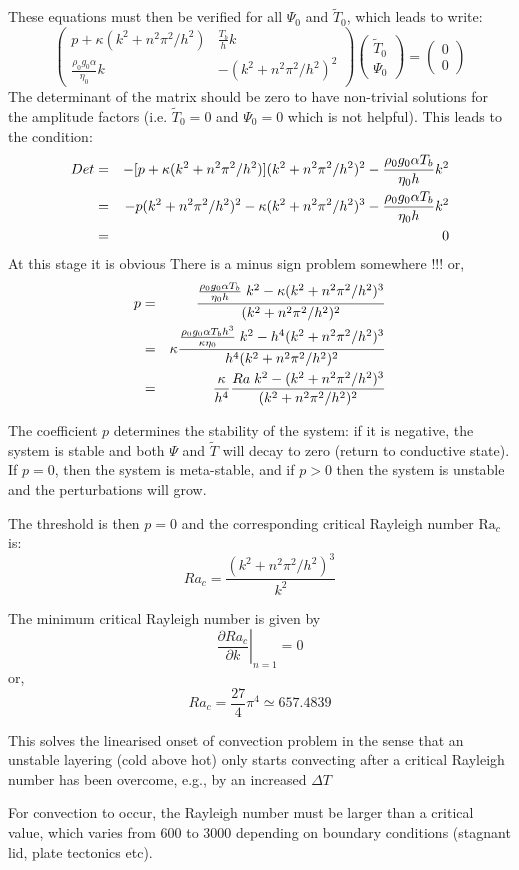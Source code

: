 These equations must then be verified for all $\Psi_0$ and $\tilde{T}_0$, 
which leads to write:
\[
\left(
\begin{array}{cc}
p + \kappa (k^2+n^2\pi^2/h^2) & \frac{T_b}{h} k \\
\frac{\rho_0 g_0 \alpha}{\eta_0}  k  & -(k^2+n^2\pi^2/h^2)^2 
\end{array}
\right)
\left(
\begin{array}{c}
\tilde{T}_0 \\ \Psi_0
\end{array}
\right)
=
\left(
\begin{array}{c}
0 \\ 0
\end{array}
\right)
\]
The determinant of the matrix should be zero to have non-trivial solutions for
the amplitude factors (i.e. $\tilde{T}_0=0$ and $\Psi_0=0$ which is not helpful).
This leads to the condition: 
\begin{eqnarray}
Det 
&=& -[p + \kappa (k^2+n^2\pi^2/h^2)](k^2+n^2\pi^2/h^2)^2 - \frac{\rho_0 g_0 \alpha T_b }{\eta_0 h}  k^2 \nonumber\\
&=& -p (k^2+n^2\pi^2/h^2)^2 - \kappa (k^2+n^2\pi^2/h^2)^3 - \frac{\rho_0 g_0 \alpha T_b }{\eta_0 h}  k^2 \nonumber\\
&=& 0
\end{eqnarray}
{\color{red}At this stage it is obvious There is a minus sign problem somewhere !!!}
or, 
\begin{eqnarray}
p 
&=&\frac{\frac{\rho_0 g_0 \alpha T_b }{\eta_0 h }  \; k^2 
- \kappa (k^2+n^2\pi^2/h^2)^3 }{ (k^2+n^2\pi^2/h^2)^2} \nonumber\\
&=& \kappa \frac{  \frac{\rho_0 g_0 \alpha T_b h^3}{ \kappa \eta_0}\; k^2 - h^4 (k^2+n^2\pi^2/h^2)^3 }{h^4 (k^2+n^2\pi^2/h^2)^2} \nonumber\\
&=& \frac{\kappa}{h^4}   \frac{Ra \; k^2 -(k^2+n^2\pi^2/h^2)^3 }{ (k^2+n^2\pi^2/h^2)^2}
\end{eqnarray}

The coefficient $p$ determines the stability of the system: if it is negative, 
the system is stable and both $\Psi$ and $\tilde{T}$ will decay to zero (return to conductive state). 
If $p=0$, then the system is meta-stable, and if $p>0$ then the system is unstable and 
the perturbations will grow. 

The threshold is then $p=0$ and the corresponding critical Rayleigh number $\text{Ra}_c$ is:
\[
Ra_c=\frac{(k^2+n^2\pi^2/h^2)^3}{k^2}
\]

The minimum critical Rayleigh number is given by 
\[
\left. \frac{\partial Ra_c}{\partial k}\right|_{n=1}=0
\]
or, 
\[
Ra_c = \frac{27}{4}\pi^4 \simeq 657.4839
\]


This solves the linearised onset of convection problem in the sense that an
unstable layering (cold above hot) only starts convecting after a critical
Rayleigh number has been overcome, e.g., by an increased $\Delta T$



For convection to occur,
the Rayleigh number must be larger than a critical value,
which varies from 600 to 3000 depending 
on boundary conditions (stagnant lid, plate tectonics etc).	

